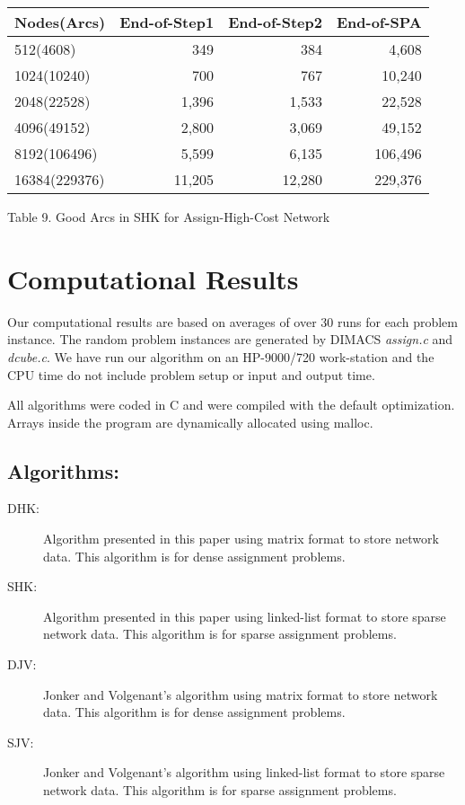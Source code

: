 \vskip 5pt
{\small
\begin{tabular}{|l|rrr|} \hline
Nodes(Arcs) &End-of-Step1 &End-of-Step2 &End-of-SPA\\ \hline
512(4608)& 349& 384& 4,608\\ 
1024(10240)& 700& 767& 10,240\\ 
2048(22528)& 1,396& 1,533& 22,528\\ 
4096(49152)& 2,800& 3,069& 49,152\\ 
8192(106496)& 5,599& 6,135& 106,496\\ 
16384(229376)& 11,205& 12,280& 229,376\\ \hline
\end{tabular}
}

\vskip 2pt
{Table 9. Good Arcs in SHK for Assign-High-Cost Network}
\vskip 5pt

\section { Computational Results}

Our computational results are based on averages of over 30 runs for each
problem instance. The random problem instances are generated
by DIMACS {\sl assign.c} and {\sl dcube.c}.
We have run our algorithm on an HP-9000/720 work-station 
and the CPU time do not include problem setup or input and output time.

All algorithms were coded in C and were compiled
with the default optimization. Arrays inside the program are
dynamically allocated using malloc.

\subsection { Algorithms:}
\begin{description} 
\item[DHK:] Algorithm presented in this paper using matrix format to store
network data. This algorithm is for dense assignment problems.

\item[SHK:] Algorithm presented in this paper using linked-list format
to store sparse network data. This algorithm is for sparse
assignment problems.

\item[DJV:] Jonker and Volgenant's algorithm using matrix format to
store network data. This algorithm is for dense assignment problems.

\item[SJV:] Jonker and Volgenant's algorithm using linked-list format
to store sparse network data. This algorithm is for sparse
assignment problems.
\end{description}

